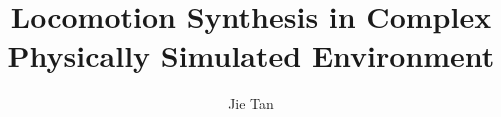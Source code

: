 \documentclass{gatech-thesis}
\title{Locomotion Synthesis in Complex Physically Simulated Environment}
\author{Jie Tan}
\begin{document}

%
\begin{preliminary}
\begin{acknowledgements}

\end{acknowledgements}
%
\contents
%
\begin{summary}

\end{summary}
\end{preliminary}
%







\begin{postliminary}
\end{postliminary}
\end{document}
